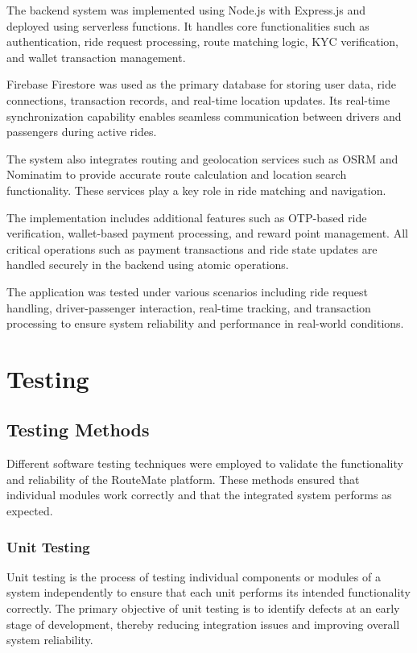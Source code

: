 \documentclass[10pt,a4paper]{report}
\begin{document}
\justify\large The backend system was implemented using Node.js with Express.js and deployed using serverless functions. It handles core functionalities such as authentication, ride request processing, route matching logic, KYC verification, and wallet transaction management.

\justify\large Firebase Firestore was used as the primary database for storing user data, ride connections, transaction records, and real-time location updates. Its real-time synchronization capability enables seamless communication between drivers and passengers during active rides.

\justify\large The system also integrates routing and geolocation services such as OSRM and Nominatim to provide accurate route calculation and location search functionality. These services play a key role in ride matching and navigation.

\justify\large The implementation includes additional features such as OTP-based ride verification, wallet-based payment processing, and reward point management. All critical operations such as payment transactions and ride state updates are handled securely in the backend using atomic operations.

\justify\large The application was tested under various scenarios including ride request handling, driver-passenger interaction, real-time tracking, and transaction processing to ensure system reliability and performance in real-world conditions.
\newpage
\chapter{Testing}

\section{Testing Methods}

\justify\large Different software testing techniques were employed to validate the functionality and reliability of the RouteMate platform. These methods ensured that individual modules work correctly and that the integrated system performs as expected.

\subsection{Unit Testing}

\justify\large Unit testing is the process of testing individual components or modules of a system independently to ensure that each unit performs its intended functionality correctly. The primary objective of unit testing is to identify defects at an early stage of development, thereby reducing integration issues and improving overall system reliability.
\end{document}
